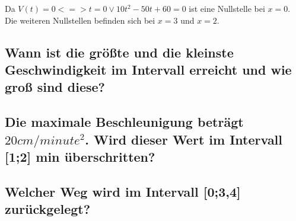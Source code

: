 \documentclass[a4paper,11pt]{scrartcl}
\begin{document}
Da $V(t) = 0 <=> t = 0 \vee 10t^2 - 50t + 60 = 0$ ist eine Nullstelle bei $x =
0$. Die weiteren Nullstellen befinden sich bei $x = 3$ und $x = 2$.

\subsection{Wann ist die größte und die kleinste Geschwindigkeit im Intervall
erreicht und wie groß sind diese?}

\subsection{Die maximale Beschleunigung beträgt $20cm / minute^2$. Wird dieser
Wert im Intervall [1;2] min überschritten?}

\subsection{Welcher Weg wird im Intervall [0;3,4] zurückgelegt?}
\end{document}
